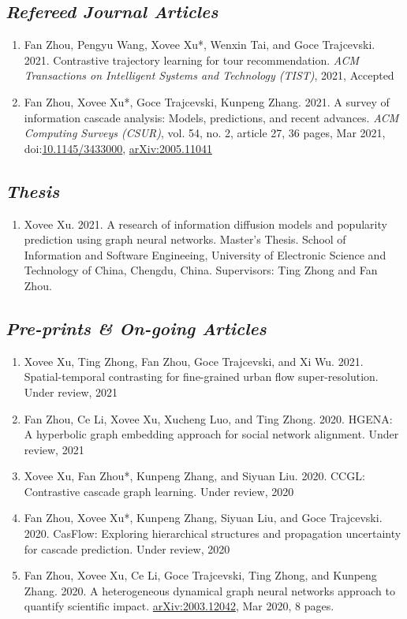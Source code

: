 \subsection*{\textnormal{\textit{Refereed Journal Articles}}}

\begin{enumerate}[resume]
    \item Fan Zhou, Pengyu Wang, Xovee Xu*, Wenxin Tai, and Goce Trajcevski. 2021. Contrastive trajectory learning for tour recommendation. \textit{ACM Transactions on Intelligent Systems and Technology (TIST)}, 2021, Accepted
    \item Fan Zhou, Xovee Xu*, Goce Trajcevski, Kunpeng Zhang. 2021. A survey of information cascade analysis: Models, predictions, and recent advances. \textit{ACM Computing Surveys (CSUR)}, vol. 54, no. 2, article 27, 36 pages, Mar 2021, doi:\href{https://xovee.cn/html/paper-redirects/csur2021.html}{10.1145/3433000}, \href{https://arxiv.org/abs/2005.11041}{arXiv:2005.11041}
\end{enumerate}

\subsection*{\textnormal{\textit{Thesis}}}

\begin{enumerate}[resume]
    \item Xovee Xu. 2021. A research of information diffusion models and popularity prediction using graph neural networks. Master's Thesis. School of Information and Software Engineeing, University of Electronic Science and Technology of China, Chengdu, China. Supervisors: Ting Zhong and Fan Zhou. 
\end{enumerate}

\subsection*{\textnormal{\textit{Pre-prints \& On-going Articles}}}

\begin{enumerate}[resume]
    \item Xovee Xu, Ting Zhong, Fan Zhou, Goce Trajcevski, and Xi Wu. 2021. Spatial-temporal contrasting for fine-grained urban flow super-resolution. Under review, 2021
    \item Fan Zhou, Ce Li, Xovee Xu, Xucheng Luo, and Ting Zhong. 2020. HGENA: A hyperbolic graph embedding approach for social network alignment. Under review, 2021
    \item Xovee Xu, Fan Zhou*, Kunpeng Zhang, and Siyuan Liu. 2020. CCGL: Contrastive cascade graph learning. Under review, 2020
    \item Fan Zhou, Xovee Xu*, Kunpeng Zhang, Siyuan Liu, and Goce Trajcevski. 2020. CasFlow: Exploring hierarchical structures and propagation uncertainty for cascade prediction. Under review, 2020
    \item Fan Zhou, Xovee Xu, Ce Li, Goce Trajcevski, Ting Zhong, and Kunpeng Zhang. 2020. A heterogeneous dynamical graph neural networks approach to quantify scientific impact. \href{https://arxiv.org/abs/2003.12042}{arXiv:2003.12042}, Mar 2020, 8 pages. 
\end{enumerate}